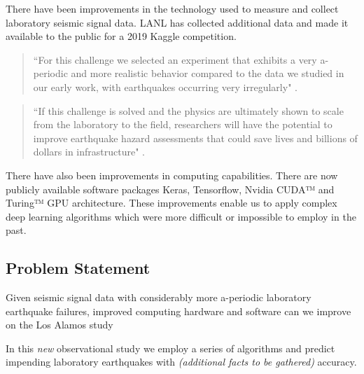 \documentclass[]{llncs}
\begin{document}



There have been improvements in the technology used to measure and collect laboratory seismic signal data. LANL has collected additional data and made it available to the public for a 2019 Kaggle competition. \par

\begin{quote}
	“For this challenge we selected an experiment that exhibits a very a-periodic and more realistic behavior compared to the data we studied in our early work, with earthquakes occurring very irregularly" \cite{kaggle}. 
\end{quote}

\begin{quote}
	“If this challenge is solved and the physics are ultimately shown to scale from the laboratory to the field, researchers will have the potential to improve earthquake hazard assessments that could save lives and billions of dollars in infrastructure" \cite{kaggle}.
\end{quote}

There have also been improvements in computing capabilities. There are now publicly available software packages Keras, Tensorflow, Nvidia CUDA™ and Turing™ GPU architecture. These improvements enable us to apply complex deep learning algorithms which were more difficult or impossible to employ in the past.\par

\subsection{Problem Statement}

Given seismic signal data with considerably more a-periodic laboratory earthquake failures, improved computing hardware and software can we improve on the Los Alamos study %


In this {\em new} observational study we employ a series of algorithms and predict impending laboratory earthquakes with {\em (additional facts to be gathered)} accuracy.
\end{document}
